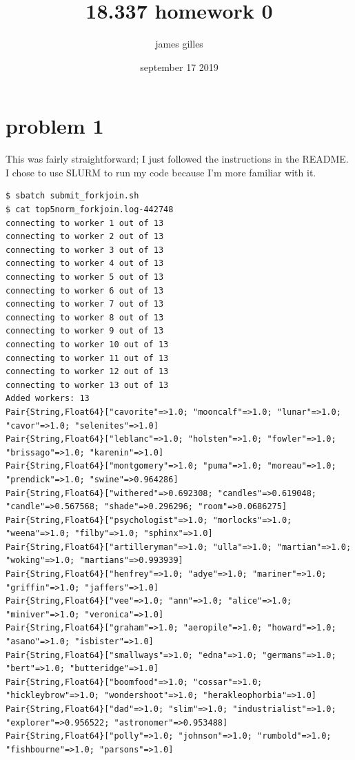 \documentclass[nobib]{tufte-handout}
\author{james gilles}
\date{september 17 2019}
\title{18.337 homework 0}
\makeatletter
\renewcommand{\maketitle}{%
\begingroup
\setlength{\parindent}{0pt}%
\setlength{\parskip}{4pt}%
\LARGE\scshape\plaintitle\par
\Large\itshape\plainauthor\par
\Large\itshape\thedate\par
\endgroup
}
\makeatother
\begin{document}
\maketitle
\tableofcontents


\section{problem 1}
\label{sec:org8b78d09}

This was fairly straightforward; I just followed the instructions in the README. I chose to use SLURM to run my code because I'm more familiar with it.

\begin{verbatim}
$ sbatch submit_forkjoin.sh
$ cat top5norm_forkjoin.log-442748
connecting to worker 1 out of 13
connecting to worker 2 out of 13
connecting to worker 3 out of 13
connecting to worker 4 out of 13
connecting to worker 5 out of 13
connecting to worker 6 out of 13
connecting to worker 7 out of 13
connecting to worker 8 out of 13
connecting to worker 9 out of 13
connecting to worker 10 out of 13
connecting to worker 11 out of 13
connecting to worker 12 out of 13
connecting to worker 13 out of 13
Added workers: 13
Pair{String,Float64}["cavorite"=>1.0; "mooncalf"=>1.0; "lunar"=>1.0; "cavor"=>1.0; "selenites"=>1.0]
Pair{String,Float64}["leblanc"=>1.0; "holsten"=>1.0; "fowler"=>1.0; "brissago"=>1.0; "karenin"=>1.0]
Pair{String,Float64}["montgomery"=>1.0; "puma"=>1.0; "moreau"=>1.0; "prendick"=>1.0; "swine"=>0.964286]
Pair{String,Float64}["withered"=>0.692308; "candles"=>0.619048; "candle"=>0.567568; "shade"=>0.296296; "room"=>0.0686275]
Pair{String,Float64}["psychologist"=>1.0; "morlocks"=>1.0; "weena"=>1.0; "filby"=>1.0; "sphinx"=>1.0]
Pair{String,Float64}["artilleryman"=>1.0; "ulla"=>1.0; "martian"=>1.0; "woking"=>1.0; "martians"=>0.993939]
Pair{String,Float64}["henfrey"=>1.0; "adye"=>1.0; "mariner"=>1.0; "griffin"=>1.0; "jaffers"=>1.0]
Pair{String,Float64}["vee"=>1.0; "ann"=>1.0; "alice"=>1.0; "miniver"=>1.0; "veronica"=>1.0]
Pair{String,Float64}["graham"=>1.0; "aeropile"=>1.0; "howard"=>1.0; "asano"=>1.0; "isbister"=>1.0]
Pair{String,Float64}["smallways"=>1.0; "edna"=>1.0; "germans"=>1.0; "bert"=>1.0; "butteridge"=>1.0]
Pair{String,Float64}["boomfood"=>1.0; "cossar"=>1.0; "hickleybrow"=>1.0; "wondershoot"=>1.0; "herakleophorbia"=>1.0]
Pair{String,Float64}["dad"=>1.0; "slim"=>1.0; "industrialist"=>1.0; "explorer"=>0.956522; "astronomer"=>0.953488]
Pair{String,Float64}["polly"=>1.0; "johnson"=>1.0; "rumbold"=>1.0; "fishbourne"=>1.0; "parsons"=>1.0]
\end{verbatim}
\end{document}

